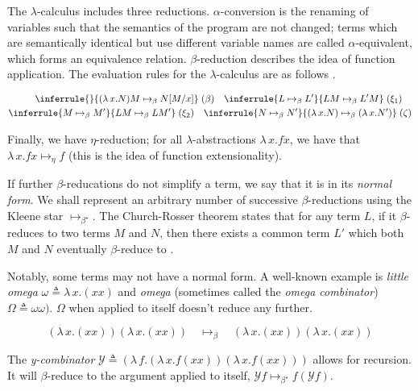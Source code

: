 \documentclass[logo,bsc,singlespacing,parskip,online]{infthesis}
\begin{document}
The $\lambda$-calculus includes three reductions. $\alpha$-conversion is the renaming of variables
such that the semantics of the program are not changed; terms which are semantically identical but
use different variable names are called $\alpha$-equivalent, which forms an equivalence relation.
$\beta$-reduction describes the idea of function application. The evaluation rules for the
$\lambda$-calculus are as follows \citep{wadler_programming_2022}.

\begin{align}
\label{equation:untyped_beta_rules}
\begin{split}
\inferrule{ }{(\lambda \, x. N)M \mapsto_{\beta} N[M/x]} \; (\beta) \quad
\inferrule{L \mapsto_{\beta} L'}{LM \mapsto_{\beta} L'M} \; (\xi_1) \quad\\
\inferrule{M \mapsto_{\beta} M'}{LM \mapsto_{\beta} LM'} \; (\xi_2) \quad
\inferrule{N \mapsto_{\beta} N'}{(\lambda \, x. N) \mapsto_{\beta} (\lambda \, x. N')} \; (\zeta)
\end{split}
\end{align}

Finally, we have $\eta$-reduction; for all $\lambda$-abstractions $\lambda \, x. f x$, we have that
$\lambda \, x. f x \mapsto_{\eta} f$ (this is the idea of function extensionality).

If further $\beta$-reducations do not simplify a term, we say that it is in its \textit{normal
form}. We shall represent an arbitrary number of successive $\beta$-reductions using the Kleene star
$\mapsto_{\beta^{\star}}$. The Church-Rosser theorem states that for any term $L$, if it
$\beta$-reduces to two terms $M$ and $N$, then there exists a common term $L'$ which both $M$ and
$N$ eventually $\beta$-reduce to \citep{church_properties_1936}.

Notably, some terms may not have a normal form. A well-known example is \textit{little omega} $\omega
\triangleq \lambda \, x. (x x)$ and \textit{omega} (sometimes called the \textit{omega combinator})
$\Omega \triangleq \omega \omega)$. $\Omega$ when applied to itself doesn't reduce any further.

\begin{equation*}
  (\lambda \, x. (x x)) (\lambda \, x. (x x)) \quad
  \mapsto_{\beta} \quad (\lambda \, x. (x x)) (\lambda \, x. (x x))
\end{equation*}

The \textit{y-combinator} $\mathcal{Y} \triangleq (\lambda \, f. (\lambda \, x. f (x x )) (\lambda
\, x. f (xx)))$ allows for recursion. It will $\beta$-reduce to the argument applied to itself,
$\mathcal{Y} f \mapsto_{\beta^{\star}} f (\mathcal{Y} f)$.
\end{document}
